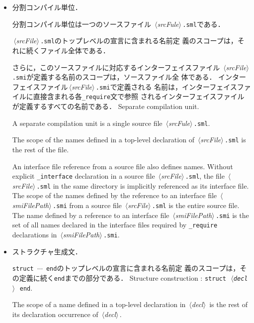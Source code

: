 \documentclass{jbook}
\newcommand{\code}[1]{\mbox{\large\tt #1}}
\newcommand{\nonterm}[1]{\mbox{$\,\langle$}{\it #1}\mbox{$\rangle\,$}}
\begin{document}
\begin{itemize}
\item 
\ifjp%
分割コンパイル単位．

	分割コンパイル単位は一つのソースファイル
\nonterm{srcFule}{\tt .sml}である．

	\nonterm{srcFile}{\tt .sml}のトップレベルの宣言に含まれる名前定
義のスコープは，それに続くファイル全体である．

	さらに，このソースファイルに対応するインターフェイスファイル
\nonterm{srcFile}{\tt .smi}が定義する名前のスコープは，ソースファイル全
体である．
	インターフェイスファイル\nonterm{srcFile}{\tt .smi}で定義される
名前は，インターフェイスファイルに直接含まれる各\code{\_require}文で参照
されるインターフェイスファイルが定義するすべての名前である．
\else%
 Separate compilation unit.

	A separate compilation unit is a single source file 
\nonterm{srcFule}{\tt .sml}.

	The scope of the names defined in a top-level declaration of 
\nonterm{srcFile}{\tt .sml} is the rest of the file.

	An interface file reference from a source file also defines
names.
	Without explicit \code{\_interface} declaration in a source file
\nonterm{srcFile}{\tt .sml}, the file \nonterm{srcFile}{\tt .sml} in the
same directory is implicitly referenced as its interface file.
	The scope of the names defined by the reference to an interface
file \nonterm{smiFilePath}{\tt .smi} from a source file
\nonterm{srcFile}{\tt .sml} is the entire source file.
	The name defined by a reference to an interface
file \nonterm{smiFilePath}{\tt .smi} is the set of all names declared
in the interface files required by \code{\_require} declarations in 
\nonterm{smiFilePath}{\tt .smi}.
\fi%

\item
\ifjp%
 ストラクチャ生成文．

	\code{struct $\cdots$ end}のトップレベルの宣言に含まれる名前定
義のスコープは，その定義に続く\code{end}までの部分である．
\else%
 Structure construction : \code{struct \nonterm{decl} end}.

	The scope of a name defined in a top-level declaration in
\nonterm{decl} is the rest of its declaration occurrence of \nonterm{decl}.
\fi%


\end{itemize}
\end{document}
